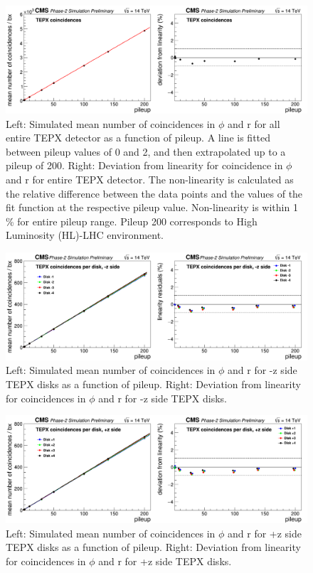 \begin{figure}[H]
  \centering
  \includegraphics[width=1 \columnwidth]{./totalcoincidences.png}
  \caption{Left: Simulated mean number of coincidences in $\phi$ and r for all entire TEPX detector as a function of pileup. A line is fitted between pileup values of 0 and 2, and then extrapolated up to a pileup of 200. Right: Deviation from linearity for coincidence in $\phi$ and r for entire TEPX detector. The non-linearity is calculated as the relative difference between the data points and the values of the fit function at the respective pileup value. Non-linearity is within 1 \% for entire pileup range. Pileup 200 corresponds to High Luminosity (HL)-LHC
environment. }
  \label{fig:CMS}
\end{figure}


\begin{figure}[H]
  \centering
  \includegraphics[width=1\columnwidth]{.//coincidencesperdisk-z.png}
  \caption{Left: Simulated mean number of coincidences in $\phi$ and r for -z side TEPX disks as a function of pileup. Right: Deviation from linearity for coincidences in $\phi$ and r for -z side TEPX disks.}
  \label{fig:CMS}
\end{figure}


\begin{figure}[H]
  \centering
  \includegraphics[width=1\columnwidth]{./coincidencesperdisk+z.png}
  \caption{Left: Simulated mean number of coincidences in $\phi$ and r for +z side TEPX disks as a function of pileup. Right: Deviation from linearity for coincidences in $\phi$ and r for +z side TEPX disks.}
  \label{fig:CMS}
\end{figure}




